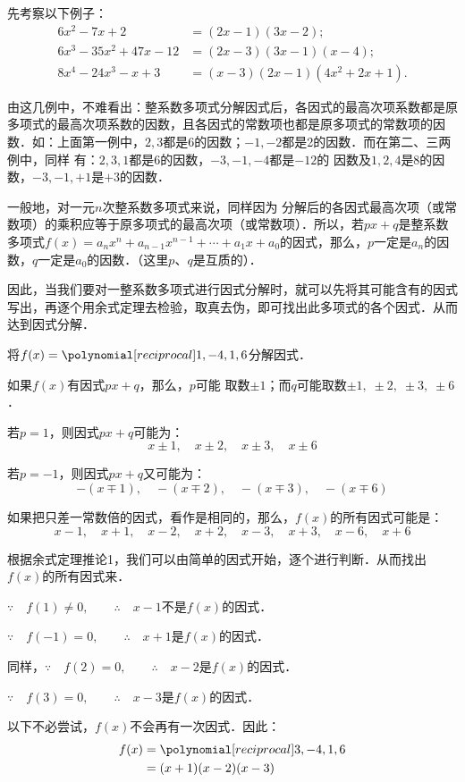 先考察以下例子：
\[\begin{split}
    6x^2-7x+2&= (2x-1) (3x-2);\\
6x^3-35x^2+47x-12&= (2x-3) (3x-1)(x-4);\\
8x^4-24x^3-x+3&= (x-3) (2x-1)(4x^2+2x+1) .
\end{split}\]

由这几例中，不难看出：整系数多项式分解因式后，各因式的最高次项系数都是原多项式的最高次项系数的因数，且各因式的常数项也都是原多项式的常数项的因数．如：上面第一例中，$2, 3$都是6的因数；$-1,-2$都是2的因数．而在第二、三两例中，同样
有：$2, 3, 1$都是6的因数，$-3,-1,-4$都是$-12$的
因数及$1, 2, 4$是8的因数，$-3,-1,+1$是$+3$的因数．

一般地，对一元$n$次整系数多项式来说，同样因为
分解后的各因式最高次项（或常数项）的乘积应等于原多项式的最高次项（或常数项）．所以，若$px+q$是整系数多项式$f(x)=a_nx^n+a_{n-1}x^{n-1}+\cdots +a_1x+a_0$的因式，那么，$p$一定是$a_n$的因数，$q$一定是$a_0$的因数．（这里$p$、$q$是互质的）．

因此，当我们要对一整系数多项式进行因式分解时，就可以先将其可能含有的因式写出，再逐个用余式定理去检验，取真去伪，即可找出此多项式的各个因式．从而达到因式分解．


\begin{example}
    将$f(x)=\poly{1,-4,1,6}$分解因式．
\end{example}

\begin{analyze}
    如果$f(x)$有因式$px+q$，那么，$p$可能
取数$\pm1$；而$q$可能取数$\pm1,\;\pm2,\;\pm3,\;\pm6$．

若$p=1$，则因式$px+q$可能为：
\[x\pm1,\quad x\pm2,\quad x\pm3,\quad x\pm6\]

若$p=-1$，则因式$px+q$又可能为：
\[- (x\mp 1) ,\quad - (x\mp 2) ,\quad - (x\mp 3) ,\quad -(x\mp 6)\]

如果把只差一常数倍的因式，看作是相同的，那么，$f(x)$的所有因式可能是：
\[x-1,\quad x+1, \quad x-2,\quad x+2,\quad x-3,\quad x+3,\quad x-6,\quad x+6\]

根据余式定理推论1，我们可以由简单的因式开始，逐个进行判断．从而找出$f(x)$的所有因式来．    
\end{analyze}


\begin{solution}
$\because\quad f(1)\ne 0,\qquad \therefore\quad x-1$不是$f(x)$的因式．

$\because\quad f(-1)= 0,\qquad \therefore\quad x+1$是$f(x)$的因式．

同样，$\because\quad f(2)= 0,\qquad \therefore\quad x-2$是$f(x)$的因式．

$\because\quad f(3)= 0,\qquad \therefore\quad x-3$是$f(x)$的因式．

以下不必尝试，$f(x)$不会再有一次因式．因此：
\[\begin{split}
 f(x)&=\poly{3,-4,1,6}\\
 &=(x+1)(x-2)(x-3)   
\end{split}\]
\end{solution}

